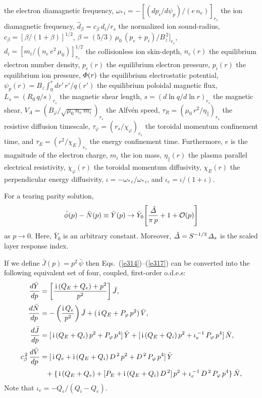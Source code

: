 \documentclass[12pt,prb,aps]{revtex4-1}
\begin{document}
the electron diamagnetic frequency, $\omega_{\ast\,i} = - [(dp_i/d\psi_p)/(e\,n_e)]_{r_s}$ the ion diamagnetic frequency, 
$\hat{d}_\beta =c_\beta\,d_i/r_s$ the normalized ion sound-radius, $c_\beta=[\beta/(1+\beta)]^{1/2}$, $\beta=(5/3)\,\mu_0\,(p_e+p_i)/B_z^{\,2}]_{r_s}$,  
$d_i= [m_i/(n_e\,e^2\,\mu_0)]^{1/2}_{r_s}$ the collisionless ion skin-depth, 
$n_e(r)$ the equilibrium electron number density, $p_e(r)$ the equilibrium electron pressure, $p_i(r)$ the equilibrium ion pressure, ${\mit\Phi}(r)$ the equilibrium 
electrostatic potential, $\psi_p(r)= B_z \int_0^r dr'\,r'/q(r')$ the equilibrium poloidal magnetic flux, 
$L_s=(R_0\,q/s)_{r_s}$ the magnetic shear length, $s=(d\ln q/d\ln r)_{r_s}$ the magnetic shear, $V_A=(B_\varphi/\sqrt{\mu_0\,n_e\,m_i})_{r_s}$ the Alfv\'{e}n speed,
$\tau_R= (\mu_0\,r^2/\eta_\parallel)_{r_s}$ the resistive diffusion timescale, $\tau_\varphi= (r_s/\chi_\varphi)_{r_s}$ the toroidal momentum confinement
time, and $\tau_E=(r^2/\chi_E)_{r_s}$ the energy confinement time. Furthermore, $e$ is the magnitude of the electron charge, $m_i$ the ion mass,
$\eta_\parallel(r)$ the plasma parallel electrical resistivity, $\chi_\varphi(r)$ the toroidal momentum diffusivity, $\chi_E(r)$ the perpendicular  energy diffusivity,  $\iota=-\omega_{\ast\,e}/\omega_{\ast\,i}$, 
and $\iota_e=\iota/(1+\iota)$. 

For a tearing parity solution, 
\begin{equation}\label{e41}
\bar{\phi}(p)-\bar{N}(p)\equiv\bar{Y} (p)\rightarrow \bar{Y}_0\!\left[\frac{\hat{\mit\Delta}}{\pi\,p} + 1+ {\cal O}(p)\right]
\end{equation}
as $p\rightarrow 0$. Here,  $\bar{Y}_0$ is an arbitrary constant. Moreover, $\hat{\mit\Delta}= S^{-1/3}\,{\mit\Delta}_s$ is the scaled
layer response index. 

If we define  $\bar{J}(p)= p^2\,\bar{\psi}$ 
then Eqs.~(\ref{e314})--(\ref{e317}) can be converted into the following equivalent set of four, coupled, first-order o.d.e.s:
\begin{align}\label{e1}
\frac{d\bar{Y}}{dp} &= \left[\frac{\,{\rm i}\,(Q_E+Q_e)+p^2}{p^2}\right]\bar{J},\\[0.5ex]
\frac{d\bar{N}}{dp} &= -\left(\frac{{\rm i}\,Q_e}{p^2}\right)\bar{J} + (\,{\rm i}\,Q_E + P_\varphi\,p^2)\,\bar{V},\\[0.5ex]
\frac{d\bar{J}}{dp} &= [\,{\rm i}\,(Q_E+Q_i)\,p^2 + P_\varphi\,p^4]\,\bar{Y}
+ [\,{\rm i}\,(Q_E+Q_i)\,p^2 + \iota_e^{\,-1}\,P_\varphi\,p^4]\,\bar{N},\\[0.5ex]
c_\beta^{\,2}\,\frac{d\bar{V}}{dp} &= [\,{\rm i}\,Q_e+ {\rm i}\,(Q_E+Q_i)\,D^{\,2}\,p^2 + D^{\,2}\,P_\varphi\,p^4]\,\bar{Y}
\nonumber\\[0.5ex]&\phantom{=} +\{\,{\rm i}\,(Q_E+Q_e) + [P_E+{\rm i}\,(Q_E + Q_i) \,D^{\,2}]\,p^2 + \iota_e^{\,-1}\,D^{\,2}\,P_\varphi\,p^4\}\,\bar{N},\label{e4}
\end{align}
Note that $\iota_e= -Q_e/(Q_i-Q_e)$. 
\end{document}
